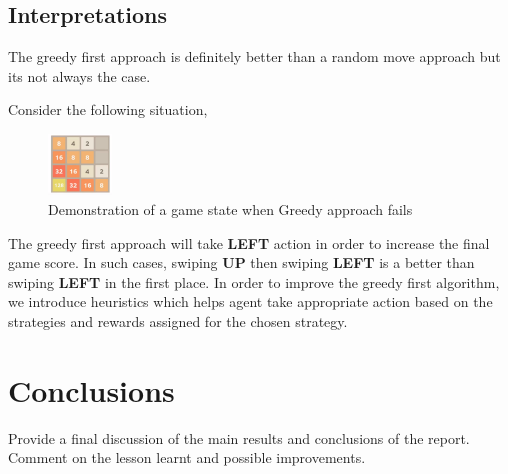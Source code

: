 \documentclass{svproc}
\begin{document}
    \subsection{Interpretations}

    The greedy first approach is definitely better than a random move approach but its not always the case.

    Consider the following situation,
    \begin{figure}[h!]

        \centering
        \includegraphics[width=0.15\textwidth]{greedy_img_correction.png}
        \caption{Demonstration of a game state when Greedy approach fails}
    \end{figure}

    The greedy first approach will take \textbf{LEFT} action in order to increase the final game score. In such cases, swiping \textbf{UP} then swiping \textbf{LEFT} is a better than swiping \textbf{LEFT} in the first place. In order to improve the greedy first algorithm, we introduce heuristics which helps agent take appropriate action based on the strategies and rewards assigned for the chosen strategy.


    \section{Conclusions}
    Provide a final discussion of the main results and conclusions of the report. Comment on the lesson learnt and possible improvements.



    
    
\end{document}
